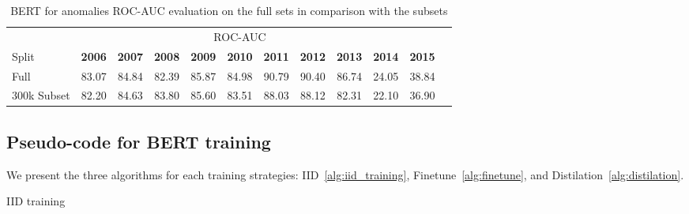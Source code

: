 \documentclass{article}
\begin{document}
\begingroup
\setlength{\tabcolsep}{4pt} \begin{table}[t]
\begin{center}
   \caption{BERT for anomalies ROC-AUC evaluation on the full sets in comparison with the subsets}
        \begin{tabular}{l c c c c c c c c c c c}
        
        \toprule
         &  & \multicolumn{7}{c}{ ROC-AUC} \\
        
        {Split} & \textbf{2006} & \textbf{2007} & \textbf{2008} & \textbf{2009} & \textbf{2010} & \textbf{2011} & \textbf{2012} &
        \textbf{2013} & \textbf{2014} & \textbf{2015} \\
        \midrule
        
        Full & 83.07 & 84.84 & 82.39 & 85.87 & 84.98 & 90.79 & 90.40 & 86.74 & 24.05 & 38.84   \\
        
        300k Subset & 82.20 & 84.63 & 83.80 & 85.60 & 83.51 & 88.03 & 88.12 & 82.31 & 22.10 & 36.90   \\

        \bottomrule
        
        \end{tabular}
        \label{tab:full_splits_bert}
\end{center}
\end{table}
\endgroup




\subsection{Pseudo-code for BERT training}
\label{appendix:pseudocode}
We present the three algorithms for each training strategies: IID~\ref{alg:iid_training}, Finetune~\ref{alg:finetune}, and Distilation~\ref{alg:distilation}. 

\begin{algorithm}
\caption{IID training}\label{alg:iid_training}
\begin{algorithmic}
\State 
\State 
\State 

\For{}

        \For{}
            
            \State {}  
            
            \State {}
            \State {} 
            

        \EndFor 

\EndFor

\end{algorithmic}
\end{algorithm}
\end{document}

